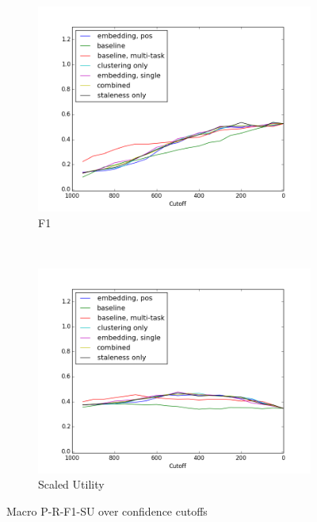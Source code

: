 \documentclass{article}
\begin{document}
\begin{figure}[tb]
    \begin{subfigure}[b]{\officialRunWidth}
            \includegraphics[width=\textwidth,clip=true,trim=15mm 0mm 15mm 5mm]{fig/macroF1}
			\caption{F1}
			\label{official:macrof1}
    \end{subfigure}
    ~
    \begin{subfigure}[b]{\officialRunWidth}
            \includegraphics[width=\textwidth,clip=true,trim=15mm 0mm 15mm 5mm]{fig/macroSU}
			\caption{Scaled Utility}
			\label{official:macrosu}
    \end{subfigure}
\caption{Macro P-R-F1-SU over confidence cutoffs}
\label{macroRuns}
\end{figure}
\end{document}
